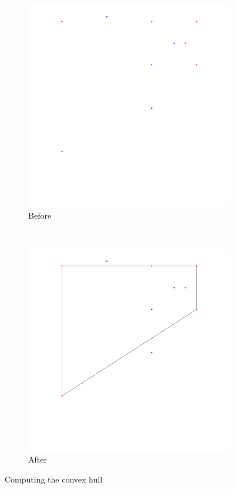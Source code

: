 \documentclass[paper=a4, fontsize=11pt]{scrartcl} %
\numberwithin{equation}{section} %
\numberwithin{figure}{section} %
\numberwithin{table}{section} %
\begin{document}
\begin{figure}[h]
        \centering
        \begin{subfigure}[b]{0.4\textwidth}
                \includegraphics[width=\textwidth]{chull_before}
                \caption{Before}
        \end{subfigure}%
        ~ %
        \begin{subfigure}[b]{0.4\textwidth}
                \includegraphics[width=\textwidth]{chull_after}
                \caption{After}
        \end{subfigure}
        \caption{Computing the convex hull}\label{fig:chull}
\end{figure}
\end{document}
